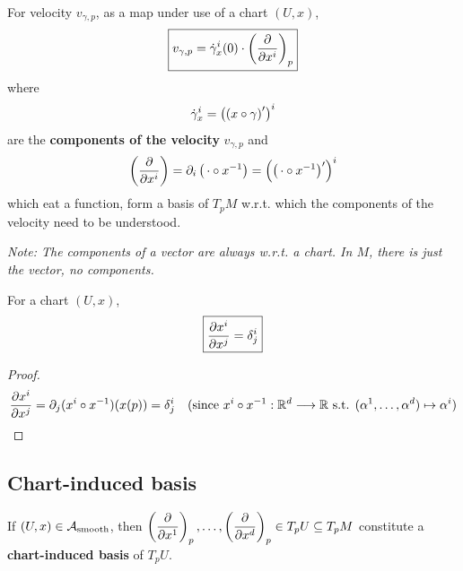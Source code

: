 \begin{definition}
For velocity $v_{\gamma,p}$, as a map under use of a chart $(U,x)$,
\begin{equation}\label{eq:defVelocityExpansion}
\boxed{v_{\gamma,p} = \dot{\gamma}_x^i(0) \cdot \left(\cibasis{x^i}\right)_p}
\end{equation} 
where
\begin{equation}\label{eq:defVelocityComponents}
\displaystyle\dot{\gamma}_x^i = \left(\left(x \after \gamma\right)^\prime\right)^i
\end{equation} 
are the \textbf{components of the velocity} $v_{\gamma,p}$ and
\begin{equation}\label{eq:defCIBasis}
\displaystyle\left(\cibasis{x^i}\right) = \partial_i\left(\,\cdot \after x^{-1}\right) = \left(\left(\, \cdot \after x^{-1}\right)^\prime\right)^i
\end{equation} 
which eat a function, form a basis of $T_pM$ w.r.t. which the components of the velocity need to be understood.
\end{definition}

\textit{Note: The components of a vector are always w.r.t. a chart. In $M$, there is just the vector, no components.} \\

\begin{theorem}
\label{thm:L5_dxiupondxj}
For a chart $(U,x)$,
\begin{equation}
\boxed{\cibasis[x^i]{x^j} = \delta^i_j}
\end{equation}
\end{theorem}
\begin{proof}
\begin{align*}
\cibasis[x^i]{x^j} = \partial_j (x^i \after x^{-1})(x(p)) = \delta^i_j && \text{(since } x^i \after x^{-1} : \R^d \to \R \text{ s.t. } (\alpha^1 , \dots , \alpha^d) \mapsto \alpha^i)
\end{align*}
\end{proof}

\subsection{Chart-induced basis}
\begin{definition}
If $(U,x) \in \A_{\text{smooth}}$, then $\displaystyle\left(\cibasis{x^1}\right)_p, \dotsc, \left(\cibasis{x^d}\right)_p \in T_pU \subseteq T_pM$ constitute a \textbf{chart-induced basis} of $T_pU$.
\end{definition}

